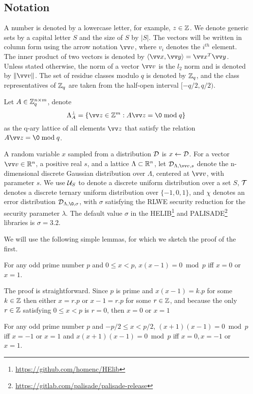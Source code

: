 \subsection{Notation}

A number is denoted by a lowercase letter, for example, $z \in \mathbb{Z}$. We denote generic sets by a capital letter $S$ and the size of $S$ by $|S|$. The vectors will be written in column form using the arrow notation $\vvv$, where $v_i$ denotes the $i^{th}$ element. The inner product of two vectors is denoted by $\inprod{\vx}{\vy}=\vx^T\vy$. Unless stated otherwise, the norm of a vector $\vvv$ is the $l_2$ norm and is denoted by $\|\vvv\|$. The set of residue classes modulo $q$ is denoted by $\mathbb{Z}_q$, and the class representatives of $\mathbb{Z}_q$ are taken from the half-open interval $[-q/2, q/2)$. 

Let $A \in \mathbb{Z}_q^{n\times m}$, denote 
\[\Lambda^{\perp}_A = \{\vz \in \Z^m :A\vz=\0 \bmod q\}\] as the q-ary lattice of all elements $\vz$ that satisfy the relation $A\vz=\0 \bmod q$. 

A random variable $x$ sampled from a distribution $\mathcal{D}$ is $x \leftarrow \mathcal{D}$. 
For a vector $\vvv \in \R^n$, a positive real $s$, and a lattice $\Lambda \subset \mathbb{R}^n$, let $\D_{\Lambda,\vvv,s}$ denote the n-dimensional discrete Gaussian distribution over $\Lambda$, centered at $\vvv$, with parameter $s$. We use $\mathcal{U}_{S}$ to denote a discrete uniform distribution over a set $S$, $\mathcal{T}$ denotes a discrete ternary uniform distribution over $\{-1, 0, 1\}$, and $\chi$ denotes an error distribution $\D_{\Lambda,\0,\sigma}$, with $\sigma$ satisfying the \ac{RLWE} security reduction \cite{lyubashevskyIdealLatticesLearning2010} for the security parameter $\lambda$. The default value $\sigma$ in the HELIB\footnote{\url{https://github.com/homenc/HElib}} and PALISADE\footnote{\url{https://gitlab.com/palisade/palisade-release}} libraries is $\sigma=3.2$.

We will use the following simple lemmas, for which we sketch the proof of the first.
\begin{lemma}\label{lm:binary}
For any odd prime number $p$ and $0\leq x < p$,  $x(x-1)=0 \bmod p$ iff $x=0$ or $x=1$.
\end{lemma}
The proof is straightforward. Since $p$ is prime and $x(x-1)=k.p$ for some $k\in\mathbb{Z}$ then either $x=r.p$ or $x-1=r.p$ for some $r\in \mathbb{Z}$, and because the only $r \in \mathbb{Z}$ satisfying $0\leq x < p$ is $r=0$, then $x=0$ or $x=1$

\begin{lemma}\label{lm:sign}
For any odd prime number $p$ and $-p/2\leq x < p/2$,  $(x+1)(x-1)=0 \bmod p$ iff $x=-1$ or $x=1$ and $x(x+1)(x-1)=0 \bmod p$ iff $x=0, x=-1$ or $x=1$.
\end{lemma}

